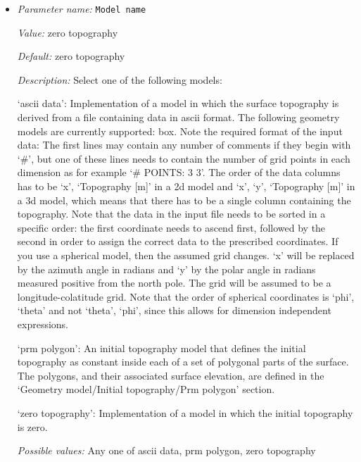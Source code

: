 \begin{itemize}
\item {\it Parameter name:} {\tt Model name}
\label{parameters:Geometry model/Initial topography model/Model name}
\label{parameters:Geometry_20model/Initial_20topography_20model/Model_20name}


{\it Value:} zero topography


{\it Default:} zero topography


{\it Description:} Select one of the following models:

`ascii data': Implementation of a model in which the surface topography is derived from a file containing data in ascii format. The following geometry models are currently supported: box. Note the required format of the input data: The first lines may contain any number of comments if they begin with `#', but one of these lines needs to contain the number of grid points in each dimension as for example `# POINTS: 3 3'. The order of the data columns has to be `x', `Topography [m]' in a 2d model and  `x', `y', `Topography [m]' in a 3d model, which means that there has to be a single column containing the topography. Note that the data in the input file needs to be sorted in a specific order: the first coordinate needs to ascend first, followed by the second in order to assign the correct data to the prescribed coordinates. If you use a spherical model, then the assumed grid changes. `x' will be replaced by the azimuth angle in radians  and `y' by the polar angle in radians measured positive from the north pole. The grid will be assumed to be a longitude-colatitude grid. Note that the order of spherical coordinates is `phi', `theta' and not `theta', `phi', since this allows for dimension independent expressions.

`prm polygon': An initial topography model that defines the initial topography as constant inside each of a set of polygonal parts of the surface. The polygons, and their associated surface elevation, are defined in the `Geometry model/Initial topography/Prm polygon' section.

`zero topography': Implementation of a model in which the initial topography is zero. 


{\it Possible values:} Any one of ascii data, prm polygon, zero topography
\end{itemize}



